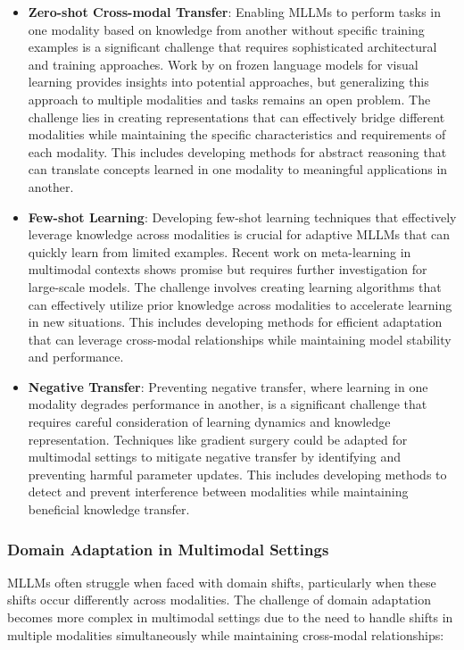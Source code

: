 \begin{itemize}
    \item \textbf{Zero-shot Cross-modal Transfer}: Enabling MLLMs to perform tasks in one modality based on knowledge from another without specific training examples is a significant challenge that requires sophisticated architectural and training approaches. Work by \citet{tsimpoukelli2021multimodal} on frozen language models for visual learning provides insights into potential approaches, but generalizing this approach to multiple modalities and tasks remains an open problem. The challenge lies in creating representations that can effectively bridge different modalities while maintaining the specific characteristics and requirements of each modality. This includes developing methods for abstract reasoning that can translate concepts learned in one modality to meaningful applications in another.
    
    \item \textbf{Few-shot Learning}: Developing few-shot learning techniques that effectively leverage knowledge across modalities is crucial for adaptive MLLMs that can quickly learn from limited examples. Recent work on meta-learning in multimodal contexts \citep{pahde2021multimodal} shows promise but requires further investigation for large-scale models. The challenge involves creating learning algorithms that can effectively utilize prior knowledge across modalities to accelerate learning in new situations. This includes developing methods for efficient adaptation that can leverage cross-modal relationships while maintaining model stability and performance.
    
    \item \textbf{Negative Transfer}: Preventing negative transfer, where learning in one modality degrades performance in another, is a significant challenge that requires careful consideration of learning dynamics and knowledge representation. Techniques like gradient surgery \citep{yu2020gradient} could be adapted for multimodal settings to mitigate negative transfer by identifying and preventing harmful parameter updates. This includes developing methods to detect and prevent interference between modalities while maintaining beneficial knowledge transfer.
\end{itemize}

\subsubsection{Domain Adaptation in Multimodal Settings}
MLLMs often struggle when faced with domain shifts, particularly when these shifts occur differently across modalities. The challenge of domain adaptation becomes more complex in multimodal settings due to the need to handle shifts in multiple modalities simultaneously while maintaining cross-modal relationships:

